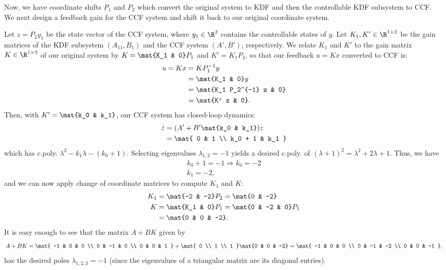 \documentclass{homework}
\begin{document}
Now, we have coordinate shifts $P_1$ and $P_2$ which convert the original system
to KDF and then the controllable KDF subsystem to CCF. We next design a feedback
gain for the CCF system and shift it back to our original coordinate system.

Let $z = P_2 y_1$ be the state vector of the CCF system, where $y_1\in\R^2$ contains
the controllable states of $y$. Let $K_1,K'\in\R^{1\times 2}$ be the gain
matrices of the KDF subsystem $(A_{11}, B_1)$ and the CCF system $(A', B')$, respectively. 
We relate $K_1$ and $K'$ to the gain matrix $K\in\R^{1 \times 3}$ of our original system
by $K = \mat{K_1 & 0} P_1$ and $K' = K_1 P_2$, so that our feedback $u=Kx$ converted
to CCF is:
\begin{align*}
    u = Kx &= KP_1^{-1}y \\
        &= \mat{K_1 & 0} y \\
        &= \mat{K_1 P_2^{-1} z & 0} \\
        &= \mat{K' z & 0}.
\end{align*}
Then, with $K' = \mat{k_0 & k_1}$, our CCF system has closed-loop dynamics:
\begin{align*}
    \dot{z} &= (A' + B'\mat{k_0 & k_1}) z \\
        &= \mat{
            0 & 1 \\
            k_0 + 1 & k_1
        }
\end{align*}
which has c.poly. $\lambda^2 - k_1 \lambda - (k_0 + 1)$. Selecting eigenvalues
$\lambda_{1,2} = -1$ yields a desired c.poly. of $(\lambda + 1)^2 = \lambda^2 + 2\lambda + 1$.
Thus, we have
\begin{align*}
    k_0 + 1 = -1 \Rightarrow k_0 = -2 \\
    k_1 = -2,
\end{align*}
and we can now apply change of coordinate matrices to compute $K_1$ and $K$:
\begin{align*}
    K_1 &= \mat{-2 & -2} P_2 = \mat{0 & -2} \\
    K &= \mat{K_1 & 0} P_1 = \mat{0 & -2 & 0} P_1 \\
      &= \mat{0 & 0 & -2}.
\end{align*}
It is easy enough to see that the matrix $A + BK$ given by
\begin{equation*}
    A + BK = \mat{
        -1 & 0 & 0 \\
        0 & -1 & 0 \\
        0 & 0 & 1
    } + \mat{
        0 \\ 1 \\ 1
    } \mat{0 & 0 & -2}
    = \mat{
        -1 & 0 & 0 \\
        0 & -1 & -2 \\
        0 & 0 & -1
    },
\end{equation*}
has the desired poles $\lambda_{1,2,3} = -1$ (since the eigenvalues of a triangular matrix are its diagonal entries).
\end{document}
